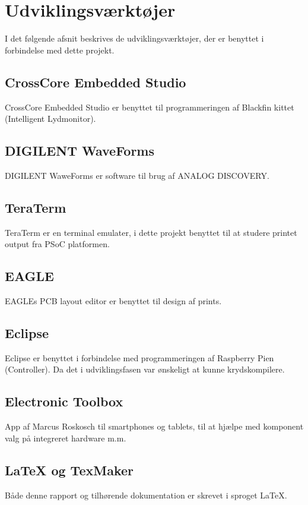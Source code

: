 \chapter{Udviklingsværktøjer}
I det følgende afsnit beskrives de udviklingsværktøjer, der er benyttet i forbindelse med dette projekt. 

\section*{CrossCore Embedded Studio}
CrossCore Embedded Studio er benyttet til programmeringen af Blackfin kittet (Intelligent Lydmonitor).

\section*{DIGILENT WaveForms}
DIGILENT WaweForms er software til brug af ANALOG DISCOVERY.

\section*{TeraTerm}
TeraTerm er en terminal emulater, i dette projekt benyttet til at studere printet output fra PSoC platformen.

\section*{EAGLE}
EAGLEs PCB layout editor er benyttet til design af prints.

\section*{Eclipse}
Eclipse er benyttet i forbindelse med programmeringen af Raspberry Pien (Controller). Da det i udviklingsfasen var ønskeligt at kunne krydskompilere. 

\section*{Electronic Toolbox}
App af Marcus Roskosch til smartphones og tablets, til at hjælpe med komponent valg på integreret hardware m.m.

\section*{LaTeX og TexMaker}
Både denne rapport og tilhørende dokumentation er skrevet i sproget \LaTeX.

